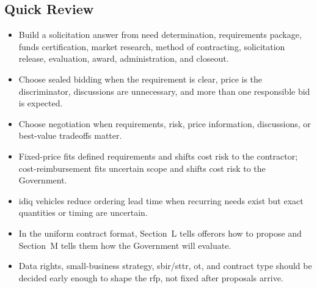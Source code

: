 \documentclass[../main.tex]{subfiles}
\begin{document}
\subsection{Quick Review}
\begin{itemize}
  \item Build a solicitation answer from need determination, requirements package, funds certification, market research, method of contracting, solicitation release, evaluation, award, administration, and closeout.
  \item Choose sealed bidding when the requirement is clear, price is the discriminator, discussions are unnecessary, and more than one responsible bid is expected.
  \item Choose negotiation when requirements, risk, price information, discussions, or best-value tradeoffs matter.
  \item Fixed-price fits defined requirements and shifts cost risk to the contractor; cost-reimbursement fits uncertain scope and shifts cost risk to the Government.
  \item \ac{idiq} vehicles reduce ordering lead time when recurring needs exist but exact quantities or timing are uncertain.
  \item In the uniform contract format, Section~L tells offerors how to propose and Section~M tells them how the Government will evaluate.
  \item Data rights, small-business strategy, \ac{sbir}/\ac{sttr}, \ac{ot}, and contract type should be decided early enough to shape the \ac{rfp}, not fixed after proposals arrive.
\end{itemize}

\end{document}
